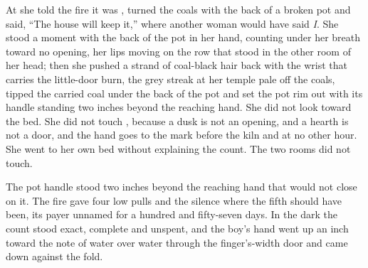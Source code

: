 At  she told the fire it was , turned the coals with the back of a broken pot and said, “The house will keep it,” where another woman would have said \emph{I}. She stood a moment with the back of the pot in her hand, counting under her breath toward no opening, her lips moving on the row that stood in the other room of her head; then she pushed a strand of coal-black hair back with the wrist that carries the little-door burn, the grey streak at her temple pale off the coals, tipped the carried coal under the back of the pot and set the pot rim out with its handle standing two inches beyond the reaching hand. She did not look toward the bed. She did not touch , because a dusk is not an opening, and a hearth is not a door, and the hand goes to the mark before the kiln and at no other hour. She went to her own bed without explaining the count. The two rooms did not touch.

The pot handle stood two inches beyond the reaching hand that would not close on it. The fire gave four low pulls and the silence where the fifth should have been, its payer unnamed for a hundred and fifty-seven days. In the dark the count stood exact, complete and unspent, and the boy's hand went up an inch toward the note of water over water through the finger's-width door and came down against the fold.
